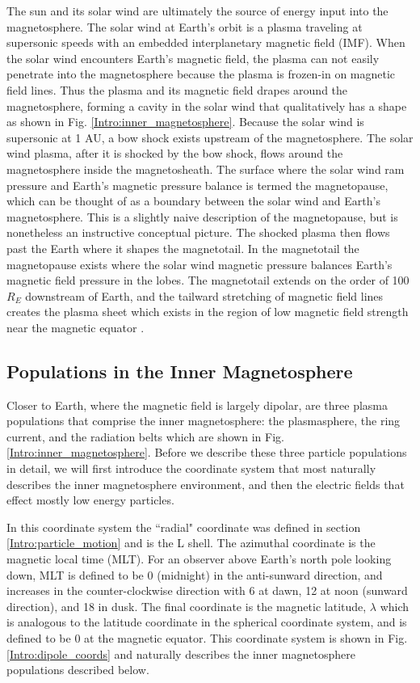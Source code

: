 The sun and its solar wind are ultimately the source of energy input into the magnetosphere. The solar wind at Earth's orbit is a plasma traveling at supersonic speeds with an embedded interplanetary magnetic field (IMF). When the solar wind encounters Earth's magnetic field, the plasma can not easily penetrate into the magnetosphere because the plasma is frozen-in on magnetic field lines. Thus the plasma and its magnetic field drapes around the magnetosphere, forming a cavity in the solar wind that qualitatively has a shape as shown in Fig. \ref{Intro:inner_magnetosphere}. Because the solar wind is supersonic at 1 AU, a bow shock exists upstream of the magnetosphere. The solar wind plasma, after it is shocked by the bow shock, flows around the magnetosphere inside the magnetosheath. The surface where the solar wind ram pressure and Earth's magnetic pressure balance is termed the magnetopause, which can be thought of as a boundary between the solar wind and Earth's magnetosphere. This is a slightly naive description of the magnetopause, but is nonetheless an instructive conceptual picture. The shocked plasma then flows past the Earth where it shapes the magnetotail. In the magnetotail the magnetopause exists where the solar wind magnetic pressure balances Earth's magnetic field pressure in the lobes. The magnetotail extends on the order of 100 $R_E$ downstream of Earth, and the tailward stretching of magnetic field lines creates the plasma sheet which exists in the region of low magnetic field strength near the magnetic equator \citep[e.g.][]{Eastwood2015}.

\subsection{Populations in the Inner Magnetosphere}\label{Intro:inner_mag}
Closer to Earth, where the magnetic field is largely dipolar, are three plasma populations that comprise the inner magnetosphere: the plasmasphere, the ring current, and the radiation belts which are shown in Fig. \ref{Intro:inner_magnetosphere}. Before we describe these three particle populations in detail, we will first introduce the coordinate system that most naturally describes the inner magnetosphere environment, and then the electric fields that effect mostly low energy particles.

In this coordinate system the ``radial" coordinate was defined in section \ref{Intro:particle_motion} and is the L shell. The azimuthal coordinate is the magnetic local time (MLT). For an observer above Earth's north pole looking down, MLT is defined to be 0 (midnight) in the anti-sunward direction, and increases in the counter-clockwise direction with 6 at dawn, 12 at noon (sunward direction), and 18 in dusk. The final coordinate is the magnetic latitude, $\lambda$ which is analogous to the latitude coordinate in the spherical coordinate system, and is defined to be 0 at the magnetic equator. This coordinate system is shown in Fig. \ref{Intro:dipole_coords} and naturally describes the inner magnetosphere populations described below.

